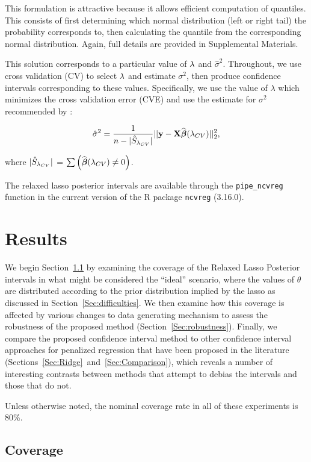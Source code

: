 This formulation is attractive because it allows efficient computation of quantiles. This consists of first determining which normal distribution (left or right tail) the probability corresponds to, then calculating the quantile from the corresponding normal distribution. Again, full details are provided in Supplemental Materials.

This solution corresponds to a particular value of $\lambda$ and $\hat{\sigma}^2$. Throughout, we use cross validation (CV) to select $\lambda$ and estimate $\sigma^2$, then produce confidence intervals corresponding to these values. Specifically, we use the value of $\lambda$ which minimizes the cross validation error (CVE) and use the estimate for $\sigma^2$ recommended by \citep{Reid2016}:

$$
\hat{\sigma}^2 = \frac{1}{n - |\hat{S}_{\lambda_{CV}}|} ||\mathbf{y} - \mathbf{X}\widehat{\boldsymbol{\beta}}({\lambda_{CV}})||_2^2,
$$

where $|\hat{S}_{\lambda_{CV}}|$ = $\sum \left( \widehat{\boldsymbol{\beta}}({\lambda_{CV}}) \neq 0 \right)$.

The relaxed lasso posterior intervals are available through the \texttt{pipe\_ncvreg} function in the current version of the R package \texttt{ncvreg} (3.16.0).

\section{Results}
\label{Sec:results}

We begin Section~\ref{Sec:coverage} by examining the coverage of the Relaxed Lasso Posterior intervals in what might be considered the ``ideal'' scenario, where the values of $\theta$ are distributed according to the prior distribution implied by the lasso as discussed in Section~\ref{Sec:difficulties}. We then examine how this coverage is affected by various changes to data generating mechanism to assess the robustness of the proposed method (Section~\ref{Sec:robustness}). Finally, we compare the proposed confidence interval method to other confidence interval approaches for penalized regression that have been proposed in the literature (Sections~\ref{Sec:Ridge}~and~\ref{Sec:Comparison}), which reveals a number of interesting contrasts between methods that attempt to debias the intervals and those that do not.

Unless otherwise noted, the nominal coverage rate in all of these experiments is 80\%.

\subsection{Coverage}\label{Sec:coverage}

